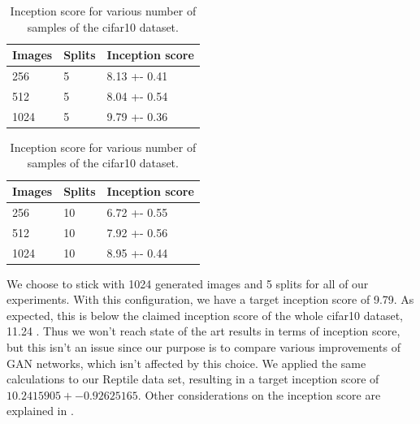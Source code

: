 \begin{table}[H]
\centering
\setlength{\tabcolsep}{0.5em} %

\begin{subtable}{.5\textwidth}
\centering

\begin{tabular}{l l l}
\toprule
Images & Splits & Inception score  \\ 
\midrule
      256  & 5 & 8.13 +- 0.41 \\   
      512  & 5 & 8.04 +- 0.54 \\ 
      1024 & 5 & 9.79 +- 0.36 \\
\bottomrule
\end{tabular}

\end{subtable}%
\begin{subtable}{.5\textwidth}
\centering

\begin{tabular}{l l l}
\toprule
Images & Splits & Inception score  \\ 
\midrule
      256  & 10 & 6.72 +- 0.55 \\   
      512  & 10 & 7.92 +- 0.56\\ 
      1024 & 10 & 8.95 +- 0.44 \\
\bottomrule
\end{tabular}
\end{subtable}%
%
\vspace{0.3cm}
\caption{Inception score for various number of samples of the cifar10 dataset.}
\label{table:exp-isc}
\end{table}%
We choose to stick with 1024 generated images and 5 splits for all of our experiments. With this configuration, we have a target inception score of 9.79. As expected, this is below the claimed inception score of the whole cifar10 dataset, 11.24 \cite{salimans2016improved}. Thus we won't reach state of the art results in terms of inception score, but this isn't an issue since our purpose is to compare various improvements of GAN networks, which isn't affected by this choice. We applied the same calculations to our Reptile data set, resulting in a target inception score of $10.2415905 +- 0.92625165$. Other considerations on the inception score are explained in \cite{barratt2018note}.

